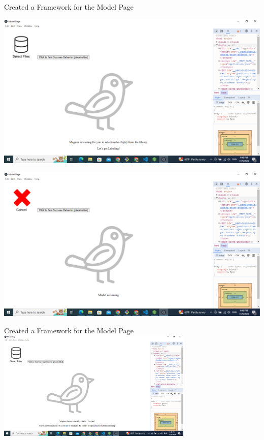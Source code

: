 \begin{frame}{Created a Framework for the Model Page}
       \centering
       \begin{minipage}{0.45\textwidth}
            \centering
            \includegraphics[width=\linewidth]{images/database1.png}
        \end{minipage}
        \hfill
        \begin{minipage}{0.45\textwidth}
            \centering
            \includegraphics[width=\linewidth]{images/database2.png}
        \end{minipage}  
\end{frame}

\begin{frame}{Created a Framework for the Model Page}
    \centering
    \includegraphics[height=0.7\textheight,width=0.7\textwidth,keepaspectratio]{images/database3.png}  
\end{frame}


